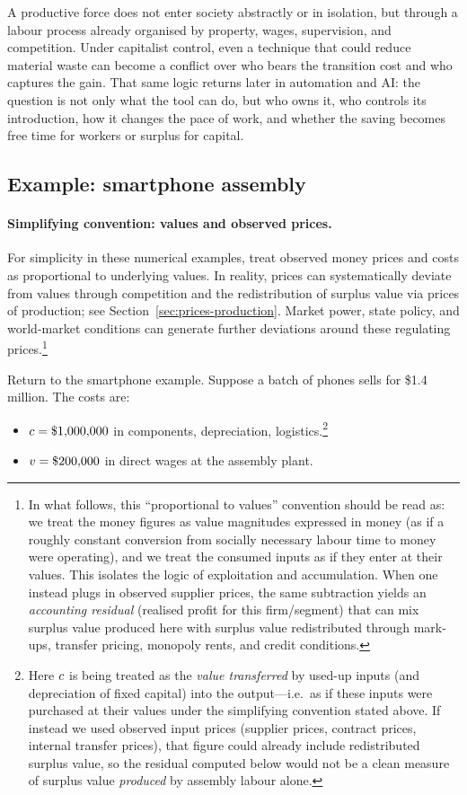 A productive force does not
enter society abstractly or in isolation, but through a labour process already organised
by property, wages, supervision, and competition. Under capitalist control, even
a technique that could reduce material waste can become a conflict over who bears
the transition cost and who captures the gain. That same logic returns later in
automation and AI: the question is not only what the tool can do, but who owns it,
who controls its introduction, how it changes the pace of work, and whether the
saving becomes free time for workers or surplus for capital.

\subsection{Example: smartphone assembly}

\paragraph{Simplifying convention: values and observed prices.}
For simplicity in these numerical examples, treat observed money prices and costs as
proportional to underlying values. In reality, prices can systematically deviate from
values through competition and the redistribution of surplus value via prices of
production; see Section~\ref{sec:prices-production}. Market power, state policy, and
world-market conditions can generate further deviations around these regulating prices.\footnote{In what follows, this ``proportional to values'' convention should be read as: we treat the money figures as value magnitudes expressed in money (as if a roughly constant conversion from socially necessary labour time to money were operating), and we treat the consumed inputs as if they enter at their values. This isolates the logic of exploitation and accumulation. When one instead plugs in observed supplier prices, the same subtraction yields an \emph{accounting residual} (realised profit for this firm/segment) that can mix surplus value produced here with surplus value redistributed through mark-ups, transfer pricing, monopoly rents, and credit conditions.}

Return to the smartphone example. Suppose a batch of phones sells for
\$1.4 million. The costs are:

\begin{itemize}[leftmargin=1.5em]
  \item $c = \$1{,}000{,}000$ in components, depreciation, logistics.\footnote{Here $c$ is being treated as the \emph{value transferred} by used-up inputs (and depreciation of fixed capital) into the output---i.e.\ as if these inputs were purchased at their values under the simplifying convention stated above. If instead we used observed input prices (supplier prices, contract prices, internal transfer prices), that figure could already include redistributed surplus value, so the residual computed below would not be a clean measure of surplus value \emph{produced} by assembly labour alone.}
  \item $v = \$200{,}000$ in direct wages at the assembly plant.
\end{itemize}

